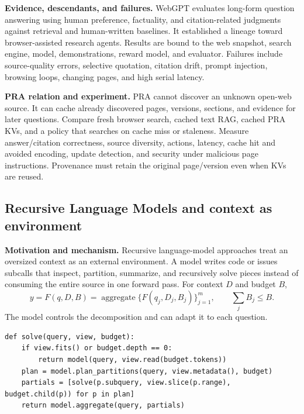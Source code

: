 \textbf{Evidence, descendants, and failures.} WebGPT evaluates long-form question answering
using human preference, factuality, and citation-related judgments against retrieval and
human-written baselines.  It established a lineage toward browser-assisted research agents.
Results are bound to the web snapshot, search engine, model, demonstrations, reward model,
and evaluator.  Failures include source-quality errors, selective quotation, citation drift,
prompt injection, browsing loops, changing pages, and high serial latency.

\textbf{PRA relation and experiment.} PRA cannot discover an unknown open-web source.
It can cache already discovered pages, versions, sections, and evidence for later questions.
Compare fresh browser search, cached text RAG, cached PRA KVs, and a policy that searches on
cache miss or staleness.  Measure answer/citation correctness, source diversity, actions,
latency, cache hit and avoided encoding, update detection, and security under malicious page
instructions.  Provenance must retain the original page/version even when KVs are reused.

\subsection{Recursive Language Models and context as environment}

\textbf{Motivation and mechanism.} Recursive language-model approaches treat an oversized
context as an external environment.  A model writes code or issues subcalls that inspect,
partition, summarize, and recursively solve pieces instead of consuming the entire source
in one forward pass.  For context $D$ and budget $B$,
\begin{equation}
y=F(q,D,B)=\operatorname{aggregate}\{F(q_j,D_j,B_j)\}_{j=1}^m,
\qquad \sum_j B_j\leq B.
\end{equation}
The model controls the decomposition and can adapt it to each question.

\begin{lstlisting}[caption={Budgeted recursive context program}]
def solve(query, view, budget):
    if view.fits() or budget.depth == 0:
        return model(query, view.read(budget.tokens))
    plan = model.plan_partitions(query, view.metadata(), budget)
    partials = [solve(p.subquery, view.slice(p.range), budget.child(p)) for p in plan]
    return model.aggregate(query, partials)
\end{lstlisting}


